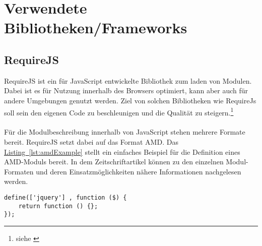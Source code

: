 \section{Verwendete Bibliotheken/Frameworks}

\subsection{RequireJS}
RequireJS ist ein für JavaScript entwickelte Bibliothek zum laden von Modulen. Dabei ist es für Nutzung innerhalb des Browsers optimiert, kann aber auch für andere Umgebungen genutzt werden. Ziel von solchen Bibliotheken wie RequireJs soll sein den eigenen Code zu beschleunigen und die Qualität zu steigern.\footnote{siehe \cite{requirejs}}\\
\\
Für die Modulbeschreibung innerhalb von JavaScript stehen mehrere Formate bereit. RequireJS setzt dabei auf das Format \gls{AMD}. Das \hyperref[lst:amdExample]{Listing~\ref{lst:amdExample}} stellt ein einfaches Beispiel für die Definition eines \gls{AMD}-Moduls bereit. In dem Zeitschriftartikel \cite{jsModuleDefinitions} können zu den einzelnen Modul-Formaten und deren Einsatzmöglichkeiten nähere Informationen nachgelesen werden.
\begin{lstlisting}[style=lstStyleFramed, caption={[Beispiel: Moduldefinition mittels \acrfull{AMD}\protect\footnote{Quelle: \cite{requirejsExample}}] Beispiel: Moduldefinition mittels \acrfull{AMD}\protect\footnotemark}, label=lst:amdExample]
define(['jquery'] , function ($) {
	return function () {};
});
\end{lstlisting}

